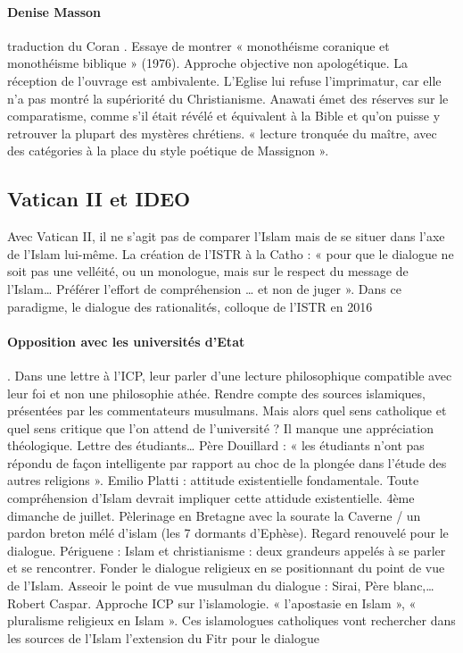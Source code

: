 \paragraph{Denise Masson} traduction du Coran . Essaye de montrer « monothéisme coranique et monothéisme biblique » (1976). Approche objective non apologétique. La réception de l’ouvrage est ambivalente. L’Eglise lui refuse l’imprimatur, car elle n’a pas montré la supériorité du Christianisme. Anawati émet des réserves sur le comparatisme, comme s’il était révélé et équivalent à la Bible et qu’on puisse y retrouver la plupart des mystères chrétiens. « lecture tronquée du maître, avec des catégories à la place du style poétique de Massignon ». 
\subsection{Vatican II et IDEO} Avec Vatican II, il ne s’agit pas de comparer l’Islam mais de se situer dans l’axe de l’Islam lui-même. La création de l’ISTR à la Catho : « pour que le dialogue ne soit pas une velléité, ou un monologue, mais sur le respect du message de l’Islam… Préférer l’effort de compréhension … et non de juger ». Dans ce paradigme, le dialogue des rationalités, colloque de l’ISTR en 2016

\paragraph{Opposition avec les universités d’Etat}. Dans une lettre à l’ICP, leur parler d’une lecture philosophique compatible avec leur foi et non une philosophie athée. Rendre compte des sources islamiques, présentées par les commentateurs musulmans. Mais alors quel sens catholique et quel sens critique que l’on attend de l’université ? Il manque une appréciation théologique. Lettre des étudiants… Père Douillard : « les étudiants n’ont pas répondu de façon intelligente par rapport au choc de la plongée dans l’étude des autres religions ». Emilio Platti : attitude existentielle fondamentale. Toute compréhension d’Islam devrait impliquer cette attidude existentielle. 
 4ème dimanche de juillet. Pèlerinage en Bretagne avec la sourate la Caverne / un pardon breton mélé d’islam (les 7 dormants d’Ephèse). Regard renouvelé pour le dialogue. Périguene : Islam et christianisme : deux grandeurs appelés à se parler et se rencontrer.   Fonder le dialogue religieux en se positionnant du point de vue de l’Islam. Asseoir le point de vue musulman du dialogue : Sirai, Père blanc,… Robert Caspar. Approche ICP sur l’islamologie. « l’apostasie en Islam », « pluralisme religieux en Islam ». Ces islamologues catholiques vont rechercher dans les sources de l’Islam l’extension du Fitr pour le dialogue 

